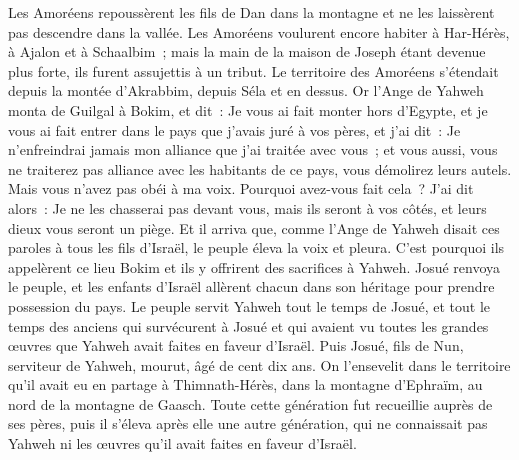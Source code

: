 \begin{multicols}{2}
Les Amoréens repoussèrent les fils de Dan dans la montagne et ne les laissèrent pas descendre dans la vallée.
Les Amoréens voulurent encore habiter à Har-Hérès, à Ajalon et à Schaalbim~; mais la main de la maison de Joseph étant devenue plus forte, ils furent assujettis à un tribut.
Le territoire des Amoréens s'étendait depuis la montée d'Akrabbim, depuis Séla et en dessus.
\VerseOne{}Or l'Ange de Yahweh monta de Guilgal à Bokim, et dit~: Je vous ai fait monter hors d'Egypte, et je vous ai fait entrer dans le pays que j'avais juré à vos pères, et j'ai dit~: Je n'enfreindrai jamais mon alliance que j'ai traitée avec vous~;
et vous aussi, vous ne traiterez pas alliance avec les habitants de ce pays, vous démolirez leurs autels. Mais vous n'avez pas obéi à ma voix. Pourquoi avez-vous fait cela~?
J'ai dit alors~: Je ne les chasserai pas devant vous, mais ils seront à vos côtés, et leurs dieux vous seront un piège.
Et il arriva que, comme l'Ange de Yahweh disait ces paroles à tous les fils d'Israël, le peuple éleva la voix et pleura.
C'est pourquoi ils appelèrent ce lieu Bokim et ils y offrirent des sacrifices à Yahweh.
Josué renvoya le peuple, et les enfants d'Israël allèrent chacun dans son héritage pour prendre possession du pays.
Le peuple servit Yahweh tout le temps de Josué, et tout le temps des anciens qui survécurent à Josué et qui avaient vu toutes les grandes œuvres que Yahweh avait faites en faveur d'Israël.
Puis Josué, fils de Nun, serviteur de Yahweh, mourut, âgé de cent dix ans.
On l'ensevelit dans le territoire qu'il avait eu en partage à Thimnath-Hérès, dans la montagne d'Ephraïm, au nord de la montagne de Gaasch.
Toute cette génération fut recueillie auprès de ses pères, puis il s'éleva après elle une autre génération, qui ne connaissait pas Yahweh ni les œuvres qu'il avait faites en faveur d'Israël.

\end{multicols}
